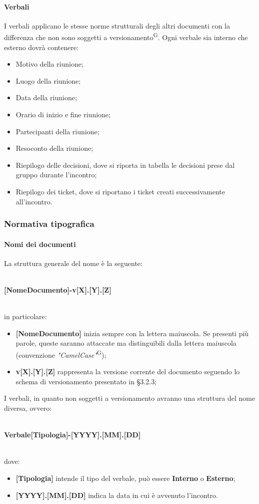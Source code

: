 \paragraph{Verbali}
I verbali applicano le stesse norme strutturali degli altri documenti con la differenza che non sono soggetti a versionamento\textsuperscript{G}. Ogni verbale sia interno che esterno dovrà contenere:
\begin{itemize}
\item Motivo della riunione;
\item Luogo della riunione;
\item Data della riunione;
\item Orario di inizio e fine riunione;
\item Partecipanti della riunione;
\item Resoconto della riunione;
\item Riepilogo delle decisioni, dove si riporta in tabella le decisioni prese dal gruppo durante l’incontro;
\item Riepilogo dei ticket, dove si riportano i ticket creati successivamente all'incontro.
\end{itemize}  		

\subsubsection{Normativa tipografica}
\paragraph{Nomi dei documenti}
La struttura generale del nome è la seguente: \\ \\
\centerline{\textbf{[NomeDocumento]-v[X].[Y].[Z]}}\\
in particolare:
\begin{itemize}
\item \textbf{[NomeDocumento]} inizia sempre con la lettera maiuscola. Se presenti più parole, queste saranno attaccate ma distinguibili dalla lettera maiuscola (convenzione \textit{"CamelCase"}\textsuperscript{G});
\item \textbf{v[X].[Y].[Z]} rappresenta la versione corrente del documento seguendo lo schema di versionamento presentato in §3.2.3;
\end{itemize}
I verbali, in quanto non soggetti a versionamento avranno una struttura del nome diversa, ovvero:\\ \\
\centerline{\textbf{Verbale[Tipologia]-[YYYY].[MM].[DD]}} \\
dove:
\begin{itemize}
\item \textbf{[Tipologia]} intende il tipo del verbale, può essere \textbf{Interno} o \textbf{Esterno};
\item \textbf{[YYYY].[MM].[DD]} indica la data in cui è avvenuto l'incontro.
\end{itemize}


